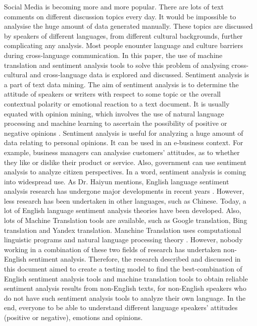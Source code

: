 \documentclass[conference]{IEEEtran}
\begin{document}
Social Media is becoming more and more popular. There are lots of text comments
on different discussion topics every day.
It would be impossible to analysise the huge amount of data generated manually.
These topics are discussed by speakers of different languages, from different
cultural backgrounds, further complicating any analysis.
Most people enounter language and culture barriers during cross-language
communication.
In this paper, the use of machine translation and sentiment analysis tools to
solve this problem of analysing cross-cultural and cross-language data is
explored and discussed.
Sentiment analysis is a part of text data mining. The aim of sentiment analysis
is to determine the attitude of speakers or writers with respect to some topic
or the overall contextual polarity or emotional reaction to a text document. It is usually equated with
opinion mining, which involves the use of natural language processing and
machine learning to ascertain the possibility of positive or negative opinions \cite{sentimentAnalysis}.
Sentiment analysis is useful for analyzing a huge amount of data relating to personal
opinions. It can be used in an e-business context. For example, business managers can analysise
customers' attitudes, as to whether they like or dislike their product or service.
Also, government can use sentiment analysis to analyze citizen perspectives.
In a word, sentiment analysis is coming into widespread use.
As Dr. Haiyun mentions, English language sentiment analysis research has
undergone major developments in recent years \cite{ChineseSentimentAnalysis}.
However, less research has been undertaken in other languages, such as Chinese.
Today, a lot of English language sentiment analysis theories have been
developed. Also, lots of Machine Translation tools are available, such as Google
translation, Bing translation and Yandex translation.
Manchine Translation uses computational linguistic programs and natural language
processing theory \cite{machineTranslation}.
However, nobody working in a combination of these two fields of research has undertaken non-English
sentiment analysis. Therefore, the research described and discussed in this
document aimed to create a testing model to find the best-combination of English
sentiment analysis tools and machine translation tools to obtain reliable
sentiment analysis results from non-English texts, for non-English speakers who
do not have such sentiment analysis tools to analyze their own language.
In the end, everyone to be able to understand different language speakers' attitudes (positive or negative), emotions and opinions.\\
\end{document}

